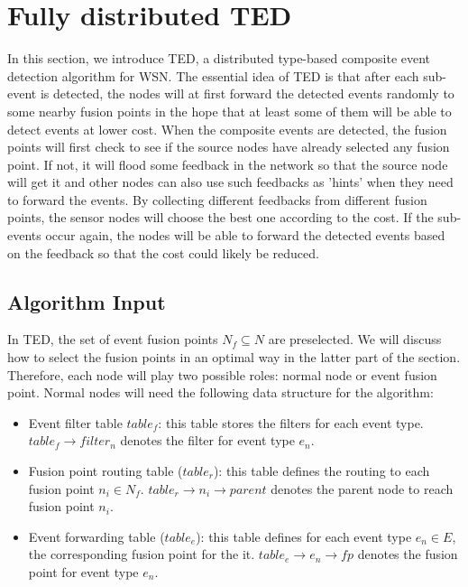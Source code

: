 \section{Fully distributed TED}
\label{sec:cedu}
In this section, we introduce TED, a distributed type-based composite event detection algorithm for WSN. The essential idea of TED is that after each sub-event is detected, the nodes will at first forward the detected events randomly to some nearby fusion points in the hope that at least some of them will be able to detect events at lower cost. When the composite events are detected, the fusion points will first check to see if the source nodes have already selected any fusion point. If not, it will flood some feedback in the network so that the source node will get it and other nodes can also use such feedbacks as 'hints' when they need to forward the events. By collecting different feedbacks from different fusion points, the sensor nodes will choose the best one according to the cost. If the sub-events occur again, the nodes will be able to forward the detected events based on the feedback so that the cost could likely be reduced.

\subsection{Algorithm Input}
In TED, the set of event fusion points \(N_f\subseteq N\) are preselected. We will discuss how to select the fusion points in an optimal way in the latter part of the section. Therefore, each node will play two possible roles: normal node or event fusion point. Normal nodes will need the following data structure for the algorithm:
\begin{itemize}
\item Event filter table \(table_f\): this table stores the filters for each event type. \(table_f\rightarrow filter_n\) denotes the filter for event type \(e_n\).
\item Fusion point routing table (\(table_r\)): this table defines the routing to each fusion point \(n_i\in N_f\). \(table_r\rightarrow n_i\rightarrow parent\) denotes the parent node to reach fusion point \(n_i\).
\item Event forwarding table (\(table_e\)): this table defines for each event type \(e_n\in E\), the corresponding fusion point for the it. \(table_e\rightarrow e_n\rightarrow fp\) denotes the fusion point for event type \(e_n\).
\end{itemize}

